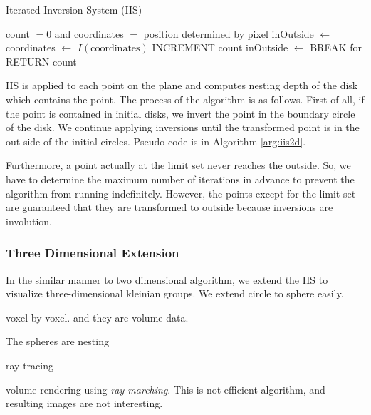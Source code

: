  \begin{algorithm}
  \caption{Iterated Inversion System (IIS)}
  \label{arg:iis2d}
  \begin{algorithmic}
   \REQUIRE count $= 0$ and coordinates $=$ position determined by
   pixel
   \STATE inOutside $\leftarrow$ \TRUE
   \STATE coordinates $\leftarrow$ $I(\text{coordinates})$
   \STATE INCREMENT count
   \STATE inOutside $\leftarrow$ \FALSE
   \ENDIF
   \ENDFOR
   \STATE BREAK for
   \ENDIF
   \ENDFOR
   \STATE RETURN count
  \end{algorithmic}
 \end{algorithm}

IIS is applied to each point on the plane and computes nesting depth of
the disk which contains the point.
The process of the algorithm is as follows.
First of all, if the point is contained in initial disks, we invert the
point in the boundary circle of the disk.
We continue applying inversions until the transformed point is in the
out side of the initial circles.
Pseudo-code is in Algorithm \ref{arg:iis2d}.

Furthermore, a point actually at the limit set never reaches the
outside. So, we have to determine the maximum number of iterations in
advance to prevent the algorithm from running indeﬁnitely.
However, the points except for the limit set are guaranteed that they
are transformed to outside because inversions are involution.

\subsubsection{Three Dimensional Extension}


In the similar manner to two dimensional algorithm,
we extend the IIS to visualize three-dimensional kleinian groups.
We extend circle to sphere easily.

voxel by voxel.
and they are volume data.

The spheres are nesting

ray tracing 

volume rendering using \textit{ray marching}.
This is not efficient algorithm, and resulting images are not interesting.


